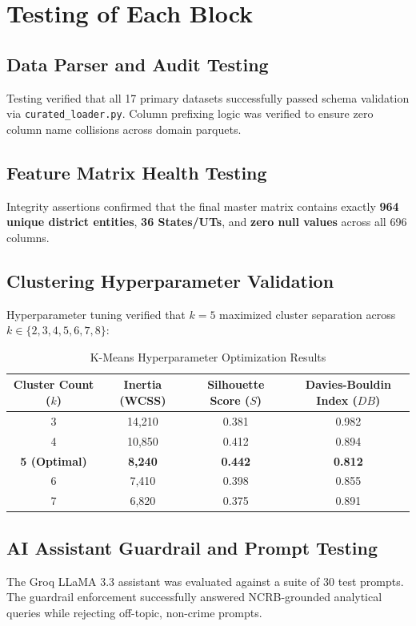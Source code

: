 \documentclass[12pt,a4paper]{report}
\begin{document}
\chapter{Testing of Each Block}

\section{Data Parser and Audit Testing}
Testing verified that all 17 primary datasets successfully passed schema validation via \texttt{curated\_loader.py}. Column prefixing logic was verified to ensure zero column name collisions across domain parquets.

\section{Feature Matrix Health Testing}
Integrity assertions confirmed that the final master matrix contains exactly \textbf{964 unique district entities}, \textbf{36 States/UTs}, and \textbf{zero null values} across all 696 columns.

\section{Clustering Hyperparameter Validation}
Hyperparameter tuning verified that $k=5$ maximized cluster separation across $k \in \{2, 3, 4, 5, 6, 7, 8\}$:
\begin{table}[h]
\centering
\small
\caption{K-Means Hyperparameter Optimization Results}
\begin{tabular}{cccc}
\toprule
\textbf{Cluster Count ($k$)} & \textbf{Inertia (WCSS)} & \textbf{Silhouette Score ($S$)} & \textbf{Davies-Bouldin Index ($DB$)} \\
\midrule
3 & 14,210 & 0.381 & 0.982 \\
4 & 10,850 & 0.412 & 0.894 \\
\textbf{5 (Optimal)} & \textbf{8,240} & \textbf{0.442} & \textbf{0.812} \\
6 & 7,410 & 0.398 & 0.855 \\
7 & 6,820 & 0.375 & 0.891 \\
\bottomrule
\end{tabular}
\end{table}

\section{AI Assistant Guardrail and Prompt Testing}
The Groq LLaMA 3.3 assistant was evaluated against a suite of 30 test prompts. The guardrail enforcement successfully answered NCRB-grounded analytical queries while rejecting off-topic, non-crime prompts.
\end{document}
